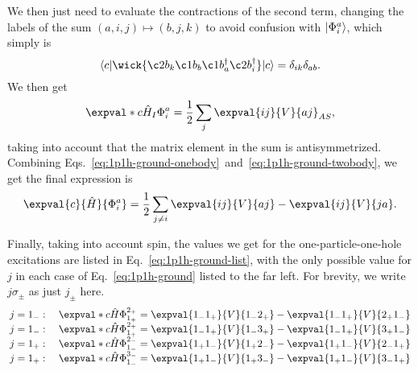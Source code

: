 We then just need to evaluate the contractions of the second term, changing the labels of the sum $(a, i, j) \mapsto (b, j, k)$ to avoid confusion with $\lvert\Phi_i^a\rangle$, which simply is
\begin{equation*}
    \langle c \vert
    \wick{
        \c2 b_k \c1 b_b \c1 b_a^\dagger \c2 b_i^\dagger
    }
    \vert c \rangle
    = \delta_{ik} \delta_{ab}.
\end{equation*}
We then get
\begin{equation}\label{eq:1p1h-ground-twobody}
    \expval*{c}{\hat{H}_I}{\Phi_i^a} = \frac{1}{2} \sum_{j} \expval{i j}{V}{a j}_{AS},
\end{equation}
taking into account that the matrix element in the sum is antisymmetrized.
Combining Eqs.~\eqref{eq:1p1h-ground-onebody}~and~\eqref{eq:1p1h-ground-twobody}, we get the final expression is
\begin{equation}\label{eq:1p1h-ground}
    \expval{c}{\hat{H}}{\Phi_i^a} = \frac{1}{2} \sum_{j \neq i} \expval{i j}{V}{a j} - \expval{i j}{V}{j a}.
\end{equation}

Finally, taking into account spin, the values we get for the one-particle-one-hole excitations are listed in Eq.~\eqref{eq:1p1h-ground-list}, with the only possible value for $j$ in each case of Eq.~\eqref{eq:1p1h-ground} listed to the far left.
For brevity, we write $j\sigma_{\pm}$ as just $j_{\pm}$ here.
\begin{equation}\label{eq:1p1h-ground-list}
    \arraycolsep=1.4pt
    \begin{array}{crcl}
        j = 1_{-}: \quad
        & \expval*{c}{\hat{H}}{\Phi_{1_{+}}^{2_{+}}}\hspace{0.27pt}
        & = &
        \expval{1_{-} 1_{+}}{V}{1_{-} 2_{+}} - \expval{1_{-} 1_{+}}{V}{2_{+} 1_{-}} \\

        j = 1_{-}: \quad
        & \expval*{c}{\hat{H}}{\Phi_{1_{+}}^{2_{+}}}\hspace{0.27pt}
        & = &
        \expval{1_{-} 1_{+}}{V}{1_{-} 3_{+}} - \expval{1_{-} 1_{+}}{V}{3_{+} 1_{-}} \\

        j = 1_{+}: \quad
        & \expval*{c}{\hat{H}}{\Phi_{1_{-}}^{2_{-}}}
        & = &
        \expval{1_{+} 1_{-}}{V}{1_{+} 2_{-}} - \expval{1_{+} 1_{-}}{V}{2_{-} 1_{+}} \\

        j = 1_{+}: \quad
        & \expval*{c}{\hat{H}}{\Phi_{1_{-}}^{3_{-}}}
        & = &
        \expval{1_{+} 1_{-}}{V}{1_{+} 3_{-}} - \expval{1_{+} 1_{-}}{V}{3_{-} 1_{+}}
    \end{array}
\end{equation}

